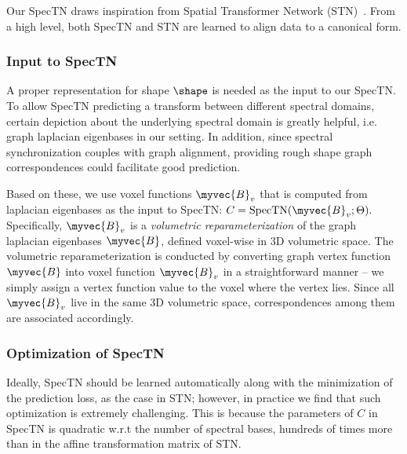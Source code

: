 Our SpecTN draws inspiration from Spatial Transformer Network (STN)~\cite{jaderberg2015spatial}. From a high level, both SpecTN and STN are learned to align data to a canonical form.

\subsubsection{Input to SpecTN}
A proper representation for shape $\shape$ is needed as the input to our SpecTN. To allow SpecTN predicting a transform between different spectral domains, certain depiction about the underlying spectral domain is greatly helpful, i.e. graph laplacian eigenbases in our setting. In addition, since spectral synchronization couples with graph alignment, providing rough shape graph correspondences could facilitate good prediction. 

Based on these, we use voxel functions $\myvec{B}_v$ that is computed from laplacian eigenbases as the input to SpecTN:
    $C=\mbox{SpecTN}(\myvec{B}_{v};\Theta).$
Specifically, $\myvec{B}_v$ is a \emph{volumetric reparameterization} of the graph laplacian eigenbases $\myvec{B}$, defined voxel-wise in 3D volumetric space. The volumetric reparameterization is conducted by converting graph vertex function $\myvec{B}$ into voxel function $\myvec{B}_v$ in a straightforward manner -- we simply assign a vertex function value to the voxel where the vertex lies. Since all $\myvec{B}_v$ live in the same 3D volumetric space, correspondences among them are associated accordingly.


\subsubsection{Optimization of SpecTN}
Ideally, SpecTN should be learned automatically along with the minimization of the prediction loss, as the case in STN; however, in practice we find that such optimization is extremely challenging. This is because the parameters of $C$ in SpecTN is quadratic w.r.t the number of spectral bases, hundreds of times more than in the affine transformation matrix of STN. 

